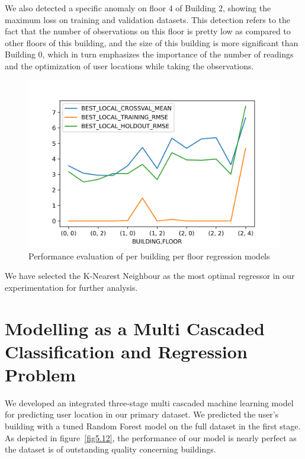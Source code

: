 \documentclass[a4paper,singleside,12pt]{report} %
\begin{document}
			We also detected a specific anomaly on floor 4 of Building 2, showing the maximum loss on training and validation datasets.
			This detection refers to the fact that the number of observations on this floor is pretty low as compared to other floors of this building, and the size of this building is more significant than Building 0, which in turn emphasizes the importance of the number of readings and the optimization of user locations while taking the observations.  
			
			
			\begin{figure}[!htb]
				\centering
				\includegraphics[width=0.8\linewidth]{./figures/best_local_metric_df.png}
				\caption{Performance evaluation of per building per floor regression models}
				 \label{fig5.11}
			\end{figure}
			
			We have selected the K-Nearest Neighbour as the most optimal regressor in our experimentation for further analysis.

		\section{Modelling as a Multi Cascaded Classification and Regression Problem}

			We developed an integrated three-stage multi cascaded machine learning model for predicting user location in our primary dataset. 
			We predicted the user's building with a tuned Random Forest model on the full dataset in the first stage. 
			As depicted in figure~\ref{fig5.12}, the performance of our model is nearly perfect as the dataset is of outstanding quality concerning buildings.
			
			
			
\end{document}
